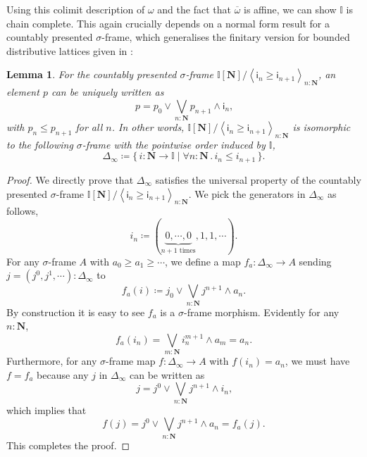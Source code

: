 \documentclass[a4paper,12pt]{amsart}
\newtheorem{lemma}[theorem]{Lemma}
\theoremstyle{definition}
\newtheorem{remark}[theorem]{Remark}
\newcommand{\mb}[1]{\mathbf{#1}}
\newcommand{\mbb}[1]{\mathbb{#1}}
\newcommand{\I}{\mbb I}
\newcommand{\ms}[1]{\mathsf{#1}}
\newcommand{\ov}[1]{\overline{#1}}
\newcommand{\pair}[1]{\left\langle#1\right\rangle}
\newcommand{\scomp}[2]{\{\,#1\mid#2\,\}}
\newcommand{\N}{\mb N}
\newcommand{\fa}[2]{\forall #1\!\colon\!\!#2\mathpunct{.}}
\begin{document}
  

Using this colimit description of $\omega$ and the fact that $\ov\omega$ is affine, we can show $\I$ is chain complete. This again crucially depends on a normal form result for a countably presented $\sigma$-frame, which generalises the finitary version for bounded distributive lattices given in :

\begin{lemma}\label{app:normalsigma}
  For the countably presented $\sigma$-frame $\I[\N]/\pair{\ms{i}_n \ge \ms{i}_{n+1}}_{n:\N}$, an element $p$ can be uniquely written as 
  \[ p = p_0 \vee \bigvee_{n:\N} p_{n+1} \wedge \ms{i}_n\text{,} \]
  with $p_n \le p_{n+1}$ for all $n$. In other words, $\I[\N]/\pair{\ms{i}_n \ge \ms{i}_{n+1}}_{n:\N}$ is isomorphic to the following $\sigma$-frame with the pointwise order induced by $\I$,
  \[ \Delta_\infty \coloneq \scomp{i : \N \to \I}{\fa n\N i_n \le i_{n+1}}\text{.} \]
\end{lemma}
\begin{proof}
  We directly prove that $\Delta_\infty$ satisfies the universal property of the countably presented $\sigma$-frame $\I[\N]/\pair{\ms{i}_n \ge \ms{i}_{n+1}}_{n:\N}$. We pick the generators in $\Delta_\infty$ as follows,
  \[ i_n \coloneq (\underbrace{0,\cdots,0}_{n+1 \text{ times}},1,1,\cdots)\text{.} \]
  For any $\sigma$-frame $A$ with $a_0 \ge a_1 \ge \cdots$, we define a map $f_a : \Delta_\infty \to A$ sending $j = (j^0,j^1,\cdots) : \Delta_\infty$ to
  \[ f_a(i) \coloneq j_0 \vee \bigvee_{n:\N} j^{n+1} \wedge a_{n}\text{.} \]
  By construction it is easy to see $f_a$ is a $\sigma$-frame morphism. Evidently for any $n : \N$, 
  \[ f_a(i_n) = \bigvee_{m:\N} i_n^{m+1} \wedge a_m = a_n\text{.} \]
  Furthermore, for any $\sigma$-frame map $f \colon \Delta_\infty \to A$ with $f(i_n) = a_n$, we must have $f = f_a$ because any $j$ in $\Delta_\infty$ can be written as
  \[ j = j^0 \vee \bigvee_{n:\N} j^{n+1} \wedge i_n\text{,} \]
  which implies that
  \[ f(j) = j^0 \vee \bigvee_{n:\N}j^{n+1} \wedge a_n = f_a(j)\text{.} \]
  This completes the proof.
\end{proof}

\end{document}
